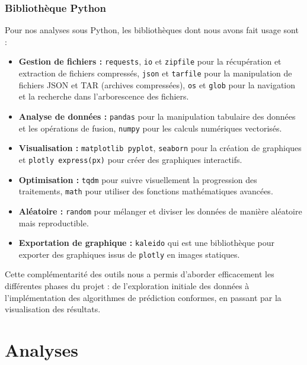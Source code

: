 \documentclass[a4paper,12pt]{article}
\begin{document}
\subsubsection{Bibliothèque Python}

Pour nos analyses sous Python, les bibliothèques dont nous avons fait usage sont :
\begin{itemize}
    \item \textbf{Gestion de fichiers :} \texttt{requests}, \texttt{io}  et \texttt{zipfile} pour la récupération et extraction de fichiers compressés, \texttt{json} et \texttt{tarfile} pour la manipulation de fichiers JSON et TAR (archives compressées), \texttt{os} et \texttt{glob} pour la navigation et la recherche dans l'arborescence des fichiers.
    \item \textbf{Analyse de données :} \texttt{pandas} pour la manipulation tabulaire des données et les opérations de fusion, \texttt{numpy} pour les calculs numériques vectorisés.
    \item \textbf{Visualisation :} \texttt{matplotlib pyplot}, \texttt{seaborn} pour la création de graphiques et \texttt{plotly express(px)} pour créer des graphiques interactifs.
    \item \textbf{Optimisation :} \texttt{tqdm} pour suivre visuellement la progression des traitements, \texttt{math} pour utiliser des fonctions mathématiques avancées.
    \item \textbf{Aléatoire :} \texttt{random} pour mélanger et diviser les données de manière aléatoire mais reproductible.
    \item \textbf{Exportation de graphique :} \texttt{kaleido} qui est une bibliothèque pour exporter des graphiques issus de \texttt{plotly} en images statiques.
\end{itemize}

\vspace{0.2cm}

Cette complémentarité des outils nous a permis d'aborder efficacement les différentes phases du projet : de l'exploration initiale des données à l'implémentation des algorithmes de prédiction conformes, en passant par la visualisation des résultats.


\section{Analyses}
\end{document}
